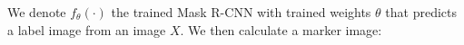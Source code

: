 



We denote $f_{\theta}(\cdot)$ the trained Mask R-CNN with trained weights $\theta$ that predicts a label image from an image $X$.
We then calculate a marker image:

